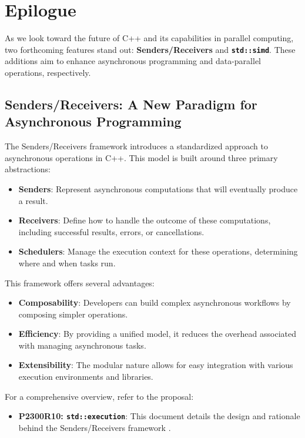 \section{Epilogue}
\label{sec:epilogue}

As we look toward the future of C++ and its capabilities in parallel computing, two forthcoming features
stand out: \textbf{Senders/Receivers} and \textbf{\texttt{std::simd}}. These additions aim to enhance
asynchronous programming and data-parallel operations, respectively.

\subsection{Senders/Receivers: A New Paradigm for Asynchronous Programming}

The Senders/Receivers framework introduces a standardized approach to asynchronous operations in C++.
This model is built around three primary abstractions:

\begin{itemize}
    \item \textbf{Senders}: Represent asynchronous computations that will eventually produce a result.
    \item \textbf{Receivers}: Define how to handle the outcome of these computations, including successful
          results, errors, or cancellations.
    \item \textbf{Schedulers}: Manage the execution context for these operations, determining where and
          when tasks run.
\end{itemize}

This framework offers several advantages:

\begin{itemize}
    \item \textbf{Composability}: Developers can build complex asynchronous workflows by composing simpler
          operations.
    \item \textbf{Efficiency}: By providing a unified model, it reduces the overhead associated with managing
          asynchronous tasks.
    \item \textbf{Extensibility}: The modular nature allows for easy integration with various execution
          environments and libraries.
\end{itemize}

For a comprehensive overview, refer to the proposal:

\begin{itemize}
    \item \textbf{P2300R10: \texttt{std::execution}}: This document details the design and rationale behind
          the Senders/Receivers framework \cite{p2300r10}.
\end{itemize}

